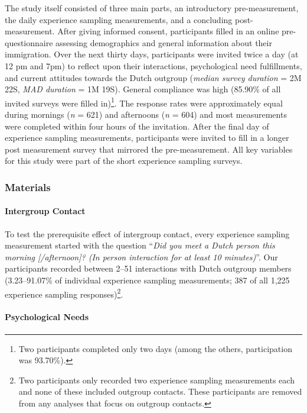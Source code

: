 The study itself consisted of three main parts, an introductory
pre-measurement, the daily experience sampling measurements, and a
concluding post-measurement. After giving informed consent, participants
filled in an online pre-questionnaire assessing demographics and general
information about their immigration. Over the next thirty days,
participants were invited twice a day (at 12 pm and 7pm) to reflect upon
their interactions, psychological need fulfillments, and current
attitudes towards the Dutch outgroup (\textit{median survey duration} =
2M 22S, \textit{MAD duration} = 1M 19S). General compliance was high
(85.90\% of all invited surveys were filled
in)\footnote{Two participants completed only two days (among the others, participation was 93.70\%).}.
The response rates were approximately equal during mornings (\textit{n}
= 621) and afternoons (\textit{n} = 604) and most measurements were
completed within four hours of the invitation. After the final day of
experience sampling measurements, participants were invited to fill in a
longer post measurement survey that mirrored the pre-measurement. All
key variables for this study were part of the short experience sampling
surveys.

\subsubsection{Materials}

\paragraph{Intergroup Contact}

To test the prerequisite effect of intergroup contact, every experience
sampling measurement started with the question
``\textit{Did you meet a Dutch person this morning [/afternoon]? (In person interaction for at least 10 minutes)}''.
Our participants recorded between 2--51 interactions with Dutch outgroup
members (3.23--91.07\% of individual experience sampling measurements;
387 of all 1,225 experience sampling
responses)\footnote{Two participants only recorded two experience sampling measurements each and none of these included outgroup contacts. These participants are removed from any analyses that focus on outgroup contacts.}.

\paragraph{Psychological Needs}

